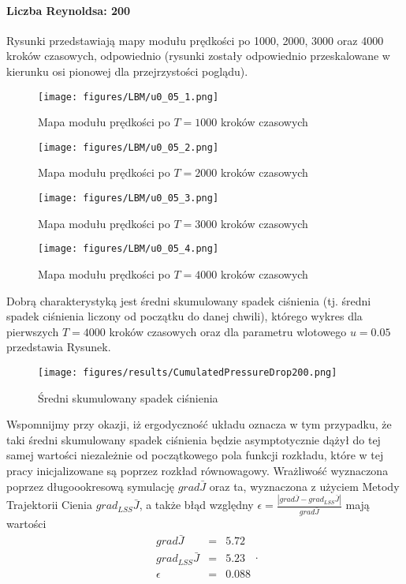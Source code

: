 \documentclass[12pt]{article}
\begin{document}
\paragraph{Liczba Reynoldsa: 200}
Rysunki przedstawiają mapy modułu prędkości po 1000, 2000, 3000 oraz 4000 kroków czasowych, odpowiednio (rysunki zostały odpowiednio przeskalowane w kierunku osi pionowej dla przejrzystości poglądu).
\begin{figure}[H]
	\texttt{[image: figures/LBM/u0\_05\_1.png]} 
	\caption{Mapa modułu prędkości po $ T=1000 $ kroków czasowych}
\end{figure}
\begin{figure}[H]
	\texttt{[image: figures/LBM/u0\_05\_2.png]} 
	\caption{Mapa modułu prędkości po $ T=2000 $ kroków czasowych}
\end{figure}
\begin{figure}[H]
	\texttt{[image: figures/LBM/u0\_05\_3.png]} 
	\caption{Mapa modułu prędkości po $ T=3000 $ kroków czasowych}
\end{figure}
\begin{figure}[H]
	\texttt{[image: figures/LBM/u0\_05\_4.png]} 
	\caption{Mapa modułu prędkości po $ T=4000 $ kroków czasowych}
\end{figure}
Dobrą charakterystyką jest średni skumulowany spadek ciśnienia (tj. średni spadek ciśnienia liczony od początku do danej chwili), którego wykres dla pierwszych $ T = 4000 $  kroków czasowych oraz dla parametru wlotowego $ u=0.05 $ przedstawia Rysunek.
\begin{figure}[H]
	\texttt{[image: figures/results/CumulatedPressureDrop200.png]} 
	\centering
	\caption{Średni skumulowany spadek ciśnienia}
\end{figure}
Wspomnijmy przy okazji, iż ergodyczność układu oznacza w tym przypadku, że taki średni skumulowany spadek ciśnienia będzie asymptotycznie dążył do tej samej wartości niezależnie od początkowego pola funkcji rozkładu, które w tej pracy inicjalizowane są poprzez rozkład równowagowy.\newline
Wrażliwość wyznaczona poprzez długoookresową symulację $ grad\bar{J} $ oraz ta, wyznaczona z użyciem Metody Trajektorii Cienia $ grad_{LSS}\bar{J} $, a także błąd względny $ \epsilon = \frac{|grad\bar{J}-grad_{LSS}\bar{J}|}{grad\bar{J}}$ mają wartości
\begin{equation}
\begin{array}{rcl}
grad\bar{J} &=& 5.72\\
grad_{LSS}\bar{J} &=& 5.23 \\
\epsilon &=& 0.088
\end{array} .
\label{result200}
\end{equation}
\end{document}

